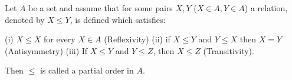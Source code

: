 Let $A$ be a set and assume that for some pairs $X, Y$ ($X \in A, Y \in A$) a relation, denoted by $X \leq Y$, is defined which satisfies:

(i) $X \leq X$ for every $X \in A$ (Reflexivity)
(ii) if $X \leq Y$ and $Y \leq X$ then $X = Y$ (Antisymmetry)
(iii) If $X \leq Y$ and $Y \leq Z$, then $X \leq Z$ (Transitivity).

Then $\leq$ is called a partial order in $A$.
